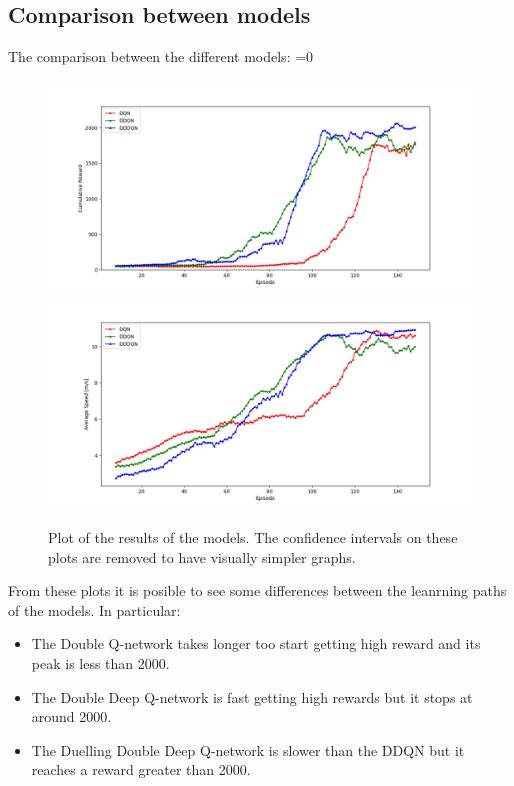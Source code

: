 \documentclass[14pt]{extarticle}
\def\sp{\vspace{5pt}}
\newcounter{debug}
\begin{document}
\begin{flushleft}
\subsection{Comparison between models}
\sp
The comparison between the different models:
\ifnum\value{debug}=0 {
	\begin{figure}[H]
    		\centering\includegraphics[width=1\textwidth]{./Image/Results/Comparison/rewards.png}
    		\vspace{-5mm}
    		\centering\includegraphics[width=1\textwidth]{./Image/Results/Comparison/speeds.png}
		\caption{Plot of the results of the models. The confidence intervals on these plots are removed to have visually simpler graphs.}
	\end{figure}
	}\fi
	From these plots it is posible to see some differences between the leanrning paths of the models. In particular:
	\begin{itemize}
	\item The Double Q-network takes longer too start getting high reward and its peak is less than 2000.
	\item The Double Deep Q-network is fast getting high rewards but it stops at around 2000.
	\item The Duelling Double Deep Q-network is slower than the DDQN but it reaches a reward greater than 2000.
	\end{itemize}
	

\end{flushleft}
\end{document}
